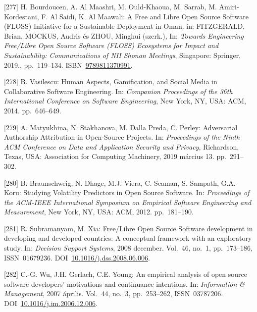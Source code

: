 \documentclass[12pt,magyar,a4paper,oneside]{scrreprt}
\newenvironment{cslreferences}%
  {}%
  {\par}
\begin{document}
\begin{cslreferences}
\leavevmode\hypertarget{ref-bourdoucen_free_2019}{}%
{[}277{]} H. Bourdoucen, A. Al Maashri, M. Ould-Khaoua, M. Sarrab, M.
Amiri-Kordestani, F. Al Saidi, K. Al Maawali: A Free and Libre Open
Source Software (FLOSS) Initiative for a Sustainable Deployment in Oman.
in: FITZGERALD, Brian, MOCKUS, Audris és ZHOU, Minghui (szerk.), In:
\emph{Towards Engineering Free/Libre Open Source Software (FLOSS)
Ecosystems for Impact and Sustainability: Communications of NII Shonan
Meetings}, Singapore: Springer, 2019., pp.~119--134.
ISBN~\href{https://worldcat.org/isbn/9789811370991}{9789811370991}.

\leavevmode\hypertarget{ref-vasilescu_human_2014}{}%
{[}278{]} B. Vasilescu: Human Aspects, Gamification, and Social Media in
Collaborative Software Engineering. In: \emph{Companion Proceedings of
the 36th International Conference on Software Engineering}, New York,
NY, USA: ACM, 2014. pp.~646--649.

\leavevmode\hypertarget{ref-matyukhina_adversarial_2019}{}%
{[}279{]} A. Matyukhina, N. Stakhanova, M. Dalla Preda, C. Perley:
Adversarial Authorship Attribution in Open-Source Projects. In:
\emph{Proceedings of the Ninth ACM Conference on Data and Application
Security and Privacy}, Richardson, Texas, USA: Association for Computing
Machinery, 2019 március 13. pp.~291--302.

\leavevmode\hypertarget{ref-braunschweig_studying_2012}{}%
{[}280{]} B. Braunschweig, N. Dhage, M.J. Viera, C. Seaman, S. Sampath,
G.A. Koru: Studying Volatility Predictors in Open Source Software. In:
\emph{Proceedings of the ACM-IEEE International Symposium on Empirical
Software Engineering and Measurement}, New York, NY, USA: ACM, 2012.
pp.~181--190.

\leavevmode\hypertarget{ref-subramanyam_freeux2flibre_2008}{}%
{[}281{]} R. Subramanyam, M. Xia: Free/Libre Open Source Software
development in developing and developed countries: A conceptual
framework with an exploratory study. In: \emph{Decision Support
Systems}, 2008 december. Vol.~46, no.~1, pp.~173--186, ISSN~01679236.
DOI~\href{https://doi.org/10.1016/j.dss.2008.06.006}{10.1016/j.dss.2008.06.006}.

\leavevmode\hypertarget{ref-wu_empirical_2007}{}%
{[}282{]} C.-G. Wu, J.H. Gerlach, C.E. Young: An empirical analysis of
open source software developers' motivations and continuance intentions.
In: \emph{Information \& Management}, 2007 április. Vol.~44, no.~3,
pp.~253--262, ISSN~03787206.
DOI~\href{https://doi.org/10.1016/j.im.2006.12.006}{10.1016/j.im.2006.12.006}.


\end{cslreferences}
\end{document}
